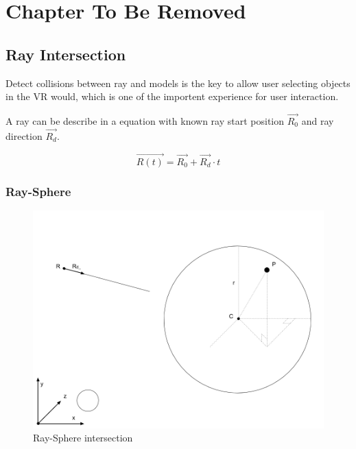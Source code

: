 \label{ChapterX}
\chapter{Chapter To Be Removed}

\section{Ray Intersection}

Detect collisions between ray and models is the key to allow user selecting objects in the VR would, which is one of the importent experience for user interaction.

A ray can be describe in a equation with known ray start position \emph{$\overrightarrow{R_{0}}$} and ray direction \emph{$\overrightarrow{R_{d}}$}.

\begin{equation}\label{equ:ray-t}
\overrightarrow{R(t)} = \overrightarrow{R_{0}} + \overrightarrow{R_{d}} \cdot t
\end{equation}

\subsection{Ray-Sphere}

\begin{figure}[h!]\label{fig:ray-sphere}
\centering
\includegraphics[width=\linewidth]{Figures/ray-sphere-intersection.png}
\decoRule
\caption[ray-sphere-intersection]{Ray-Sphere intersection}
\end{figure}

